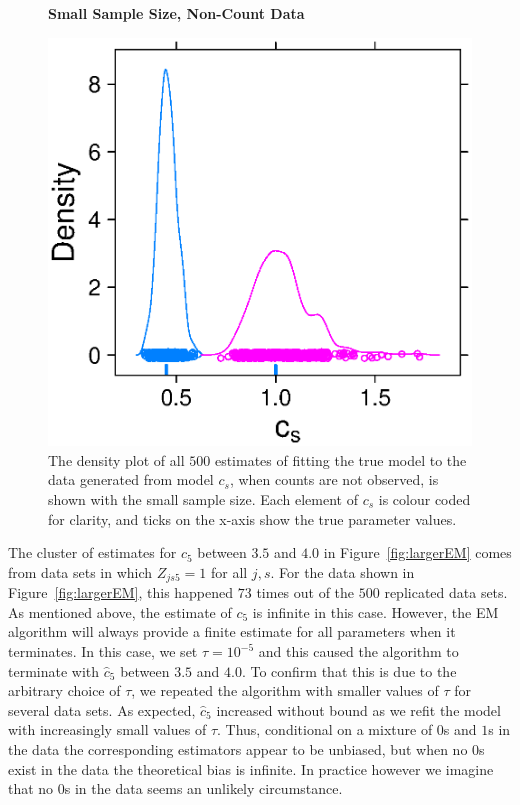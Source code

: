 \documentclass[smallextended]{svjour3}
\begin{document}
\begin{figure}
  \textbf{Small Sample Size, Non-Count Data}\par
  \centering
  \includegraphics[scale=0.75]{smallEM}
  \caption{The density plot of all $500$ estimates of fitting the true model to the data generated from model $c_s$, when counts are not observed, is shown with the small sample size.  Each element of $c_s$ is colour coded for clarity, and ticks on the x-axis show the true parameter values.}
  \label{fig:smallEM}
\end{figure}

The cluster of estimates for $c_5$ between $3.5$ and $4.0$ in Figure~\ref{fig:largerEM} comes from data sets in which $Z_{js5}=1$ for all $j,s$.  For the data shown in Figure~\ref{fig:largerEM}, this happened $73$ times out of the $500$ replicated data sets.  As mentioned above, the estimate of $c_5$ is infinite in this case.  However, the EM algorithm will always provide a finite estimate for all parameters when it terminates.  In this case, we set $\tau=10^{-5}$ and this caused the algorithm to terminate with $\hat c_5$ between $3.5$ and $4.0$.  To confirm that this is due to the arbitrary choice of $\tau$, we repeated the algorithm with smaller values of $\tau$ for several data sets. As expected, $\hat c_5$ increased without bound as we refit the model with increasingly small values of $\tau$.  Thus, conditional on a mixture of $0$s and $1$s in the data the corresponding estimators appear to be unbiased, but when no $0$s exist in the data the theoretical bias is infinite.  In practice however we imagine that no $0$s in the data seems an unlikely circumstance.
\end{document}
